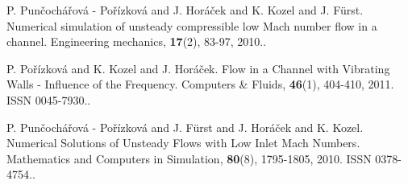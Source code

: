 
\begin{thebibliography}{10}

{\sc P. Pun\v{c}och\'a\v{r}ov\'a - Po\v{r}\'izkov\'a and J. Hor\'a\v{c}ek and K. Kozel and J. F\"urst}. {Numerical simulation of unsteady compressible low Mach number flow in a channel}. Engineering mechanics, {\bf 17}(2), 83-97, 2010..



{\sc P. Po\v{r}\'izkov\'a and K. Kozel and J. Hor\'a\v{c}ek}. {Flow in a Channel with Vibrating Walls - Influence of the Frequency}. Computers \& Fluids, {\bf 46}(1), 404-410, 2011. ISSN 0045-7930..



{\sc P. Pun\v{c}och\'a\v{r}ov\'a - Po\v{r}\'izkov\'a and J. F\"{u}rst and J. Hor\'a\v{c}ek and K. Kozel}. {Numerical Solutions of Unsteady Flows with Low Inlet Mach Numbers}. Mathematics and Computers in Simulation, {\bf 80}(8), 1795-1805, 2010. ISSN 0378-4754..

\end{thebibliography}
